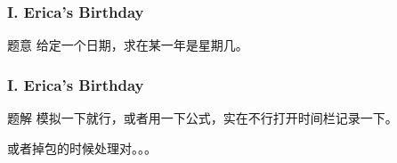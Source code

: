 \renewcommand{\problemname}{ I. Erica's Birthday}

\begin{frame}\frametitle{\problemname}

    \begin{block}{题意}
        给定一个日期，求在某一年是星期几。
    \end{block}

\end{frame}

\begin{frame}\frametitle{\problemname}
	
	\begin{block}{题解}
		模拟一下就行，或者用一下公式，实在不行打开时间栏记录一下。

		或者掉包的时候处理对。。。
	\end{block}
	
\end{frame}
